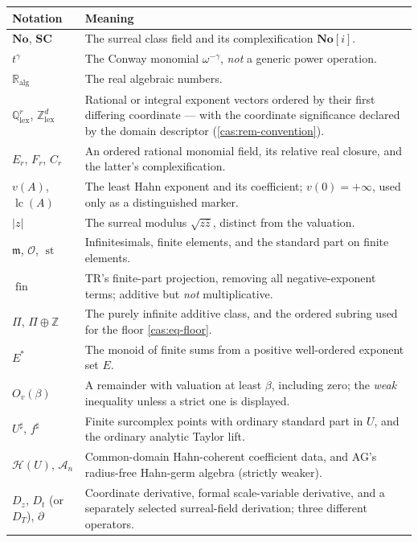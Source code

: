 \documentclass[11pt,letterpaper]{article}
\numberwithin{equation}{section}
\theoremstyle{definition}
\theoremstyle{remark}
\newcommand{\No}{\mathbf{No}}
\newcommand{\SC}{\mathbf{SC}}
\newcommand{\Q}{\mathbb Q}
\newcommand{\Z}{\mathbb Z}
\newcommand{\RA}{\mathbb R_{\mathrm{alg}}}
\newcommand{\OO}{\mathcal O}
\newcommand{\mm}{\mathfrak m}
\newcommand{\HH}{\mathscr H}
\newcommand{\Acal}{\mathscr A}
\newcommand{\st}{\operatorname{st}}
\newcommand{\fin}{\operatorname{fin}}
\newcommand{\lc}{\operatorname{lc}}
\newcommand{\Ov}[1]{O_v(#1)}
\newcommand{\sh}{^{\sharp}}
\begin{document}
\begingroup\small
\begin{longtable}{@{}P{0.25\textwidth}P{0.68\textwidth}@{}}
\toprule
Notation & Meaning\\
\midrule\endhead
$\No$, $\SC$ & The surreal class field and its complexification $\No[i]$.\\[0.3em]
$t^\gamma$ & The Conway monomial $\omega^{-\gamma}$, \emph{not} a generic power
operation.\\[0.3em]
$\RA$ & The real algebraic numbers.\\[0.3em]
$\Q^r_{\mathrm{lex}}$, $\Z^d_{\mathrm{lex}}$ & Rational or integral exponent
vectors ordered by their first differing coordinate --- with the coordinate
significance declared by the domain descriptor
(\cref{cas:rem-convention}).\\[0.3em]
$E_r$, $F_r$, $C_r$ & An ordered rational monomial field, its relative real
closure, and the latter's complexification.\\[0.3em]
$v(A)$, $\lc(A)$ & The least Hahn exponent and its coefficient;
$v(0)=+\infty$, used only as a distinguished marker.\\[0.3em]
$|z|$ & The surreal modulus $\sqrt{z\bar z}$, distinct from the
valuation.\\[0.3em]
$\mm$, $\OO$, $\st$ & Infinitesimals, finite elements, and the standard part on
finite elements.\\[0.3em]
$\fin$ & TR's finite-part projection, removing all negative-exponent terms;
additive but \emph{not} multiplicative.\\[0.3em]
$\Pi$, $\Pi\oplus\Z$ & The purely infinite additive class, and the ordered
subring used for the floor \eqref{cas:eq-floor}.\\[0.3em]
$E^*$ & The monoid of finite sums from a positive well-ordered exponent set
$E$.\\[0.3em]
$\Ov{\beta}$ & A remainder with valuation at least $\beta$, including zero; the
\emph{weak} inequality unless a strict one is displayed.\\[0.3em]
$U\sh$, $f\sh$ & Finite surcomplex points with ordinary standard part in $U$,
and the ordinary analytic Taylor lift.\\[0.3em]
$\HH(U)$, $\Acal_n$ & Common-domain Hahn-coherent coefficient data, and AG's
radius-free Hahn-germ algebra (strictly weaker).\\[0.3em]
$D_z$, $D_t$ (or $D_T$), $\partial$ & Coordinate derivative, formal
scale-variable derivative, and a separately selected surreal-field derivation;
three different operators.\\[0.3em]

\end{longtable}
\end{document}
